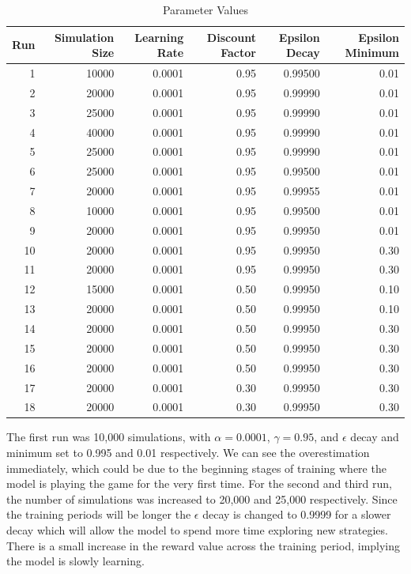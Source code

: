 \documentclass[12pt]{article}
\begin{document}
\begin{thesis}
\begin{table}[H]
\centering
\caption{\label{tab:parametertable}Parameter Values}
\centering
\begin{tabular}[t]{r|r|r|r|r|r}
\hline
Run & Simulation Size & Learning Rate & Discount Factor & Epsilon Decay & Epsilon Minimum\\
\hline
1 & 10000 & 0.0001 & 0.95 & 0.99500 & 0.01\\
\hline
2 & 20000 & 0.0001 & 0.95 & 0.99990 & 0.01\\
\hline
3 & 25000 & 0.0001 & 0.95 & 0.99990 & 0.01\\
\hline
4 & 40000 & 0.0001 & 0.95 & 0.99990 & 0.01\\
\hline
5 & 25000 & 0.0001 & 0.95 & 0.99990 & 0.01\\
\hline
6 & 25000 & 0.0001 & 0.95 & 0.99500 & 0.01\\
\hline
7 & 20000 & 0.0001 & 0.95 & 0.99955 & 0.01\\
\hline
8 & 10000 & 0.0001 & 0.95 & 0.99500 & 0.01\\
\hline
9 & 20000 & 0.0001 & 0.95 & 0.99950 & 0.01\\
\hline
10 & 20000 & 0.0001 & 0.95 & 0.99950 & 0.30\\
\hline
11 & 20000 & 0.0001 & 0.95 & 0.99950 & 0.30\\
\hline
12 & 15000 & 0.0001 & 0.50 & 0.99950 & 0.10\\
\hline
13 & 20000 & 0.0001 & 0.50 & 0.99950 & 0.10\\
\hline
14 & 20000 & 0.0001 & 0.50 & 0.99950 & 0.30\\
\hline
15 & 20000 & 0.0001 & 0.50 & 0.99950 & 0.30\\
\hline
16 & 20000 & 0.0001 & 0.50 & 0.99950 & 0.30\\
\hline
17 & 20000 & 0.0001 & 0.30 & 0.99950 & 0.30\\
\hline
18 & 20000 & 0.0001 & 0.30 & 0.99950 & 0.30\\
\hline
\end{tabular}
\end{table}

The first run was 10,000 simulations, with \(\alpha=0.0001\), \(\gamma=0.95\), and \(\epsilon\) decay and minimum set to 0.995 and 0.01 respectively. We can see the overestimation immediately, which could be due to the beginning stages of training where the model is playing the game for the very first time.
For the second and third run, the number of simulations was increased to 20,000 and 25,000 respectively. Since the training periods will be longer the \(\epsilon\) decay is changed to 0.9999 for a slower decay which will allow the model to spend more time exploring new strategies. There is a small increase in the reward value across the training period, implying the model is slowly learning.


\end{thesis}
\end{document}
